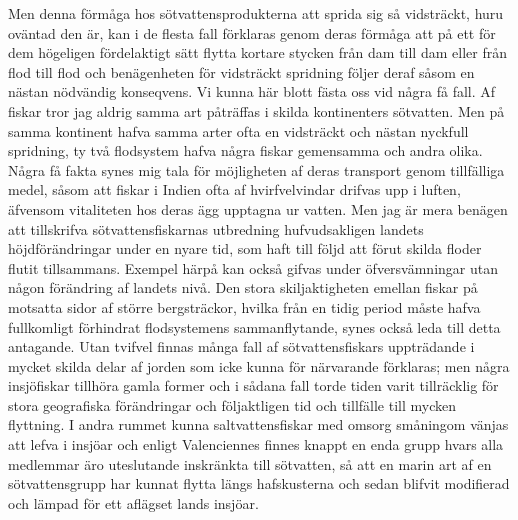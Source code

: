 Men denna förmåga hos sötvattensprodukterna att sprida sig så vidsträckt, huru oväntad den är, kan i de flesta fall förklaras genom deras förmåga att på ett för dem högeligen fördelaktigt sätt flytta kortare stycken från dam till dam eller från flod till flod och benägenheten för vidsträckt spridning följer deraf såsom en nästan nödvändig konseqvens. Vi kunna här blott fästa oss vid några få fall. Af fiskar tror jag aldrig samma art påträffas i skilda kontinenters sötvatten. Men på samma kontinent hafva samma arter ofta en vidsträckt och nästan nyckfull spridning, ty två flodsystem hafva några fiskar gemensamma och andra olika. Några få fakta synes mig tala för möjligheten af deras transport genom tillfälliga medel, såsom att fiskar i Indien ofta af hvirfvelvindar drifvas upp i luften, äfvensom vitaliteten hos deras ägg upptagna ur vatten. Men jag är mera benägen att tillskrifva sötvattensfiskarnas utbredning hufvudsakligen landets höjdförändringar under en nyare tid, som haft till följd att förut skilda floder flutit tillsammans. Exempel härpå kan också gifvas under öfversvämningar utan någon förändring af landets nivå. Den stora skiljaktigheten emellan fiskar på motsatta sidor af större bergsträckor, hvilka från en tidig period måste hafva fullkomligt förhindrat flodsystemens sammanflytande, synes också leda till detta antagande. Utan tvifvel finnas många fall af sötvattensfiskars uppträdande i mycket skilda delar af jorden som icke kunna för närvarande förklaras; men några insjöfiskar tillhöra gamla former och i sådana fall torde tiden varit tillräcklig för stora geografiska förändringar och följaktligen tid och tillfälle till mycken flyttning. I andra rummet kunna saltvattensfiskar med omsorg småningom vänjas att lefva i insjöar och enligt Valenciennes finnes knappt en enda grupp hvars alla medlemmar äro uteslutande inskränkta till sötvatten, så att en marin art af en sötvattensgrupp har kunnat flytta längs hafskusterna och sedan blifvit modifierad och lämpad för ett aflägset lands insjöar.


